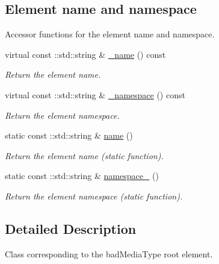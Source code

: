 \subsection*{Element name and namespace}
\label{_amgrpd4b5b61f6e07390f4af2465e04571f34}
Accessor functions for the element name and namespace. \begin{DoxyCompactItemize}
\item 
virtual const ::std::string \& \hyperlink{classopenstack_1_1xml_1_1BadMediaType_a8dd4642cdb070464ecfac44b3973e3cc}{\_\-name} () const 
\begin{DoxyCompactList}\small\item\em Return the element name. \item\end{DoxyCompactList}\item 
virtual const ::std::string \& \hyperlink{classopenstack_1_1xml_1_1BadMediaType_ab99653b9fb3281ff0418a9102c033c66}{\_\-namespace} () const 
\begin{DoxyCompactList}\small\item\em Return the element namespace. \item\end{DoxyCompactList}\item 
static const ::std::string \& \hyperlink{classopenstack_1_1xml_1_1BadMediaType_a0d62ca793c1d8c6aa93b37133608e4b6}{name} ()
\begin{DoxyCompactList}\small\item\em Return the element name (static function). \item\end{DoxyCompactList}\item 
static const ::std::string \& \hyperlink{classopenstack_1_1xml_1_1BadMediaType_aefa82a75370841c028cc4d4edb1bc18f}{namespace\_\-} ()
\begin{DoxyCompactList}\small\item\em Return the element namespace (static function). \item\end{DoxyCompactList}\end{DoxyCompactItemize}


\subsection{Detailed Description}
Class corresponding to the badMediaType root element. 

